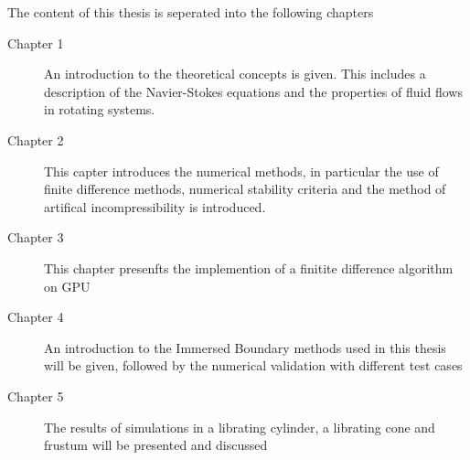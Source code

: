 The content of this thesis is seperated into the following chapters
\begin{description}
\item[Chapter 1] An introduction to the theoretical concepts is given.  This includes a description of the Navier-Stokes equations
                    and the properties of fluid flows in rotating systems.
\item[Chapter 2] This capter introduces the numerical methods, in particular the use of finite difference methods,
                    numerical stability criteria and the method of artifical incompressibility is introduced.
\item[Chapter 3] This chapter presenfts the implemention of a finitite difference  algorithm on GPU

\item[Chapter 4] An introduction to  the Immersed Boundary methods used in this thesis will be given, followed by
                 the numerical validation with different test cases

\item[Chapter 5] The results of simulations in a librating cylinder, a librating cone and frustum will be presented and discussed
\end{description}

%












